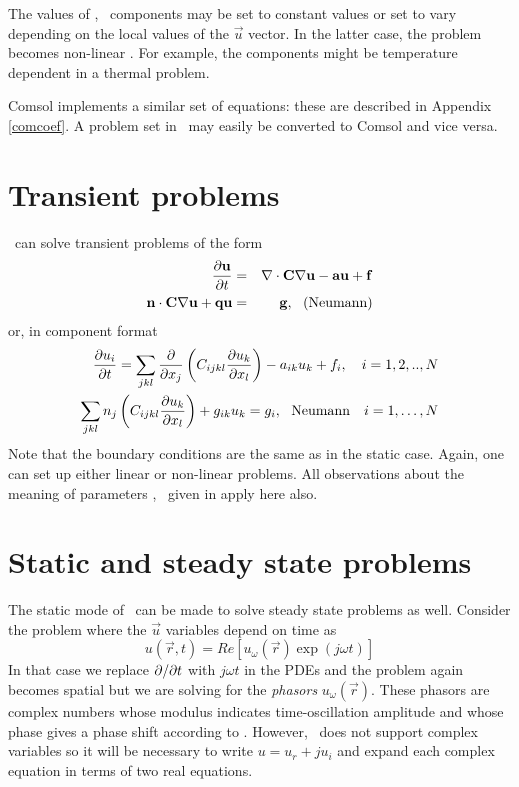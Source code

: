 \documentclass[a4paper,twoside,11pt]{book}
\begin{document}
The values of \caf, \qg\ components may be set to constant values or set to
vary depending on the local values of the $\vec u$ vector. In
the latter case, the problem becomes non-linear . For
example, the components might be temperature dependent in a thermal problem. 

Comsol implements a similar set of equations: these are described in
Appendix \ref{comcoef}. A problem set in \zinc\ may easily be
converted to Comsol and vice versa.

\section{Transient problems}

\zinc\ can solve transient problems of the form
\begin{eqnarray}
  \frac{\partial\mathbf{u}}{\partial t}&=&\nabla\cdot \mathbf{C}\nabla\mathbf{u}-\mathbf{a}\mathbf{u}+\mathbf{f}\\
  \mathbf{n}\cdot \mathbf{C}\nabla\mathbf{u}+\mathbf{q}\mathbf{u}&=&\mathbf{g},~~ \mathrm{(Neumann)}
\end{eqnarray}
or, in component format
\begin{eqnarray}
  \frac{\partial u_i}{\partial t}=\sum_{jkl}\frac{\partial}{\partial x_j}\left(C_{ijkl} \frac{\partial u_k}{\partial x_l}\right)-a_{ik}u_k+f_i,~~~i=1,2,..,N\\
  \sum_{jkl}n_j \left(C_{ijkl} \frac{\partial u_k}{\partial x_l}\right)+g_{ik} u_k=g_i,~~\mathrm{Neumann}~~~i=1,\ldots,N
\end{eqnarray}
Note that the boundary conditions are the same as in the static
case. Again, one can set up either linear or non-linear problems. All
observations about the meaning of parameters \caf, \qg\ given in
 apply here also.

\section{Static and steady state problems}

The static mode of \zinc\ can be made to solve steady state problems
as well. Consider the problem where the $\vec u$ variables depend on
time as
\begin{equation}
  u(\vec r,t)=Re [u_\omega(\vec r) \exp(j\omega t)]
  \label{phasor}
\end{equation}
In that case we replace $\partial/\partial t$ with $j\omega t$ in the PDEs and the
problem again becomes spatial but we are solving for the
\emph{phasors} $u_\omega(\vec r)$. These phasors are complex numbers
whose modulus indicates time-oscillation amplitude and whose phase
gives a phase shift according to . However, \zinc\ does not
support complex variables so it will be necessary to write
$u=u_r+ju_i$ and expand each complex equation in terms of two real
equations.
\end{document}

